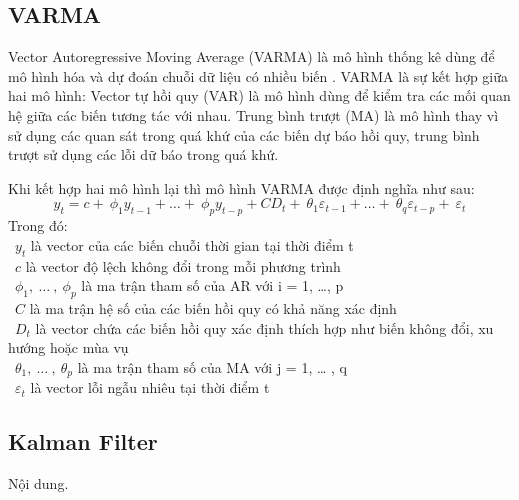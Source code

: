 \subsection{VARMA}
Vector Autoregressive Moving Average (VARMA) là mô hình thống kê dùng để mô hình hóa và dự đoán chuỗi dữ liệu có nhiều biến . VARMA là sự kết hợp giữa hai mô hình: Vector tự hồi quy (VAR) là mô hình dùng để kiểm tra các mối quan hệ giữa các biến tương tác với nhau. Trung bình trượt (MA) là mô hình thay vì sử dụng các quan sát trong quá khứ của các biến dự báo hồi quy, trung bình trượt sử dụng các lỗi dữ báo trong quá khứ. 
\par
Khi kết hợp hai mô hình lại thì mô hình VARMA được định nghĩa như sau:
\[y_{t} = c + \ \phi_{1}y_{t - 1} + \ldots + \ \phi_{p}y_{t - p} + CD_{t} + \ \theta_{1}\varepsilon_{t - 1} + \ldots + \ \theta_{q}\varepsilon_{t - p} + \ \varepsilon_{t}\]
Trong đó:\\
    \indent\textbullet\ \(y_{t}\) là vector của các biến chuỗi thời gian tại thời điểm t\\
    \indent\textbullet\ \(c\) là vector độ lệch không đổi trong mỗi phương trình\\
    \indent\textbullet\ \(\phi_{1},\ \ldots\ ,\ \phi_{p}\) là ma trận tham số của AR với i = 1, …, p\\
    \indent\textbullet\ \(C\) là ma trận hệ số của các biến hồi quy có khả năng xác định\\
    \indent\textbullet\ \(D_{t}\) là vector chứa các biến hồi quy xác định thích hợp như biến không đổi, xu hướng hoặc mùa vụ\\
    \indent\textbullet\ \(\theta_{1},\ \ldots\ ,\ \theta_{p}\) là ma trận tham số của MA với j = 1, … , q\\
    \indent\textbullet\ \(\varepsilon_{t}\) là vector lỗi ngẫu nhiêu tại thời điểm t\\

\subsection{Kalman Filter}
Nội dung.

